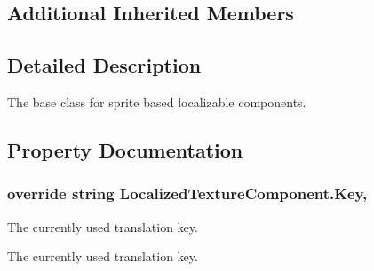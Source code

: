 \subsection*{Additional Inherited Members}


\subsection{Detailed Description}
The base class for sprite based localizable components. 



\subsection{Property Documentation}
\subsubsection[{\texorpdfstring{Key}{Key}}]{\setlength{\rightskip}{0pt plus 5cm}override string Localized\+Texture\+Component.\+Key\hspace{0.3cm}{\ttfamily [get]}, {\ttfamily [set]}}\hypertarget{class_localized_texture_component_acfd68f76863eed365ae745974ba6c04b}{}\label{class_localized_texture_component_acfd68f76863eed365ae745974ba6c04b}


The currently used translation key. 

The currently used translation key.
